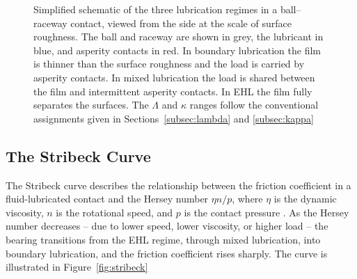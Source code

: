 \begin{figure}[htbp]
\caption{Simplified schematic of the three lubrication regimes in a ball--raceway contact, viewed from the side at the scale of surface roughness. The ball and raceway are shown in grey, the lubricant in blue, and asperity contacts in red. In boundary lubrication the film is thinner than the surface roughness and the load is carried by asperity contacts. In mixed lubrication the load is shared between the film and intermittent asperity contacts. In EHL the film fully separates the surfaces. The $\Lambda$ and $\kappa$ ranges follow the conventional assignments given in Sections~\ref{subsec:lambda} and \ref{subsec:kappa}}
\label{fig:lubrication_regimes}
\end{figure}


\subsection{The Stribeck Curve}
\label{subsec:stribeck}
The Stribeck curve describes the relationship between the friction coefficient in a fluid-lubricated contact and the Hersey number $\eta n / p$, where $\eta$ is the dynamic viscosity, $n$ is the rotational speed, and $p$ is the contact pressure \cite{stribeck_wesentlichen_1902}. As the Hersey number decreases -- due to lower speed, lower viscosity, or higher load -- the bearing transitions from the EHL regime, through mixed lubrication, into boundary lubrication, and the friction coefficient rises sharply. The curve is illustrated in Figure~\ref{fig:stribeck}

